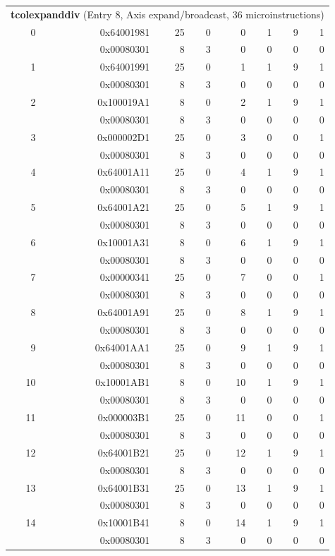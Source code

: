 \begin{longtable}{r r r r r r r r}
\multicolumn{8}{l}{\textbf{tcolexpanddiv} (Entry 8, Axis expand/broadcast, 36 microinstructions)} \\
0 & 0x64001981 & 25 & 0 & 0 & 1 & 9 & 1 \\
  & 0x00080301 & 8 & 3 & 0 & 0 & 0 & 0 \\
1 & 0x64001991 & 25 & 0 & 1 & 1 & 9 & 1 \\
  & 0x00080301 & 8 & 3 & 0 & 0 & 0 & 0 \\
2 & 0x100019A1 & 8 & 0 & 2 & 1 & 9 & 1 \\
  & 0x00080301 & 8 & 3 & 0 & 0 & 0 & 0 \\
3 & 0x000002D1 & 25 & 0 & 3 & 0 & 0 & 1 \\
  & 0x00080301 & 8 & 3 & 0 & 0 & 0 & 0 \\
4 & 0x64001A11 & 25 & 0 & 4 & 1 & 9 & 1 \\
  & 0x00080301 & 8 & 3 & 0 & 0 & 0 & 0 \\
5 & 0x64001A21 & 25 & 0 & 5 & 1 & 9 & 1 \\
  & 0x00080301 & 8 & 3 & 0 & 0 & 0 & 0 \\
6 & 0x10001A31 & 8 & 0 & 6 & 1 & 9 & 1 \\
  & 0x00080301 & 8 & 3 & 0 & 0 & 0 & 0 \\
7 & 0x00000341 & 25 & 0 & 7 & 0 & 0 & 1 \\
  & 0x00080301 & 8 & 3 & 0 & 0 & 0 & 0 \\
8 & 0x64001A91 & 25 & 0 & 8 & 1 & 9 & 1 \\
  & 0x00080301 & 8 & 3 & 0 & 0 & 0 & 0 \\
9 & 0x64001AA1 & 25 & 0 & 9 & 1 & 9 & 1 \\
  & 0x00080301 & 8 & 3 & 0 & 0 & 0 & 0 \\
10 & 0x10001AB1 & 8 & 0 & 10 & 1 & 9 & 1 \\
  & 0x00080301 & 8 & 3 & 0 & 0 & 0 & 0 \\
11 & 0x000003B1 & 25 & 0 & 11 & 0 & 0 & 1 \\
  & 0x00080301 & 8 & 3 & 0 & 0 & 0 & 0 \\
12 & 0x64001B21 & 25 & 0 & 12 & 1 & 9 & 1 \\
  & 0x00080301 & 8 & 3 & 0 & 0 & 0 & 0 \\
13 & 0x64001B31 & 25 & 0 & 13 & 1 & 9 & 1 \\
  & 0x00080301 & 8 & 3 & 0 & 0 & 0 & 0 \\
14 & 0x10001B41 & 8 & 0 & 14 & 1 & 9 & 1 \\
  & 0x00080301 & 8 & 3 & 0 & 0 & 0 & 0 \\

\end{longtable}

